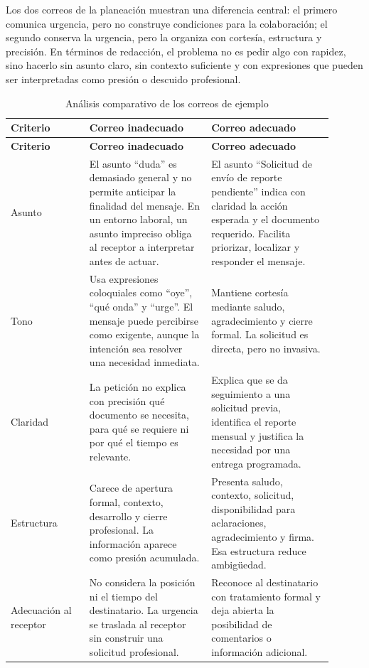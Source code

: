 Los dos correos de la planeación muestran una diferencia central: el primero comunica urgencia, pero no construye condiciones para la colaboración; el segundo conserva la urgencia, pero la organiza con cortesía, estructura y precisión. En términos de redacción, el problema no es pedir algo con rapidez, sino hacerlo sin asunto claro, sin contexto suficiente y con expresiones que pueden ser interpretadas como presión o descuido profesional.

\begin{longtable}{@{}p{0.22\linewidth}p{0.34\linewidth}p{0.34\linewidth}@{}}
\caption{Análisis comparativo de los correos de ejemplo}\label{tab:analisis-correos}\\
\toprule
\textbf{Criterio} & \textbf{Correo inadecuado} & \textbf{Correo adecuado} \\
\midrule
\endfirsthead
\toprule
\textbf{Criterio} & \textbf{Correo inadecuado} & \textbf{Correo adecuado} \\
\midrule
\endhead
Asunto & El asunto ``duda'' es demasiado general y no permite anticipar la finalidad del mensaje. En un entorno laboral, un asunto impreciso obliga al receptor a interpretar antes de actuar. & El asunto ``Solicitud de envío de reporte pendiente'' indica con claridad la acción esperada y el documento requerido. Facilita priorizar, localizar y responder el mensaje. \\
\addlinespace
Tono & Usa expresiones coloquiales como ``oye'', ``qué onda'' y ``urge''. El mensaje puede percibirse como exigente, aunque la intención sea resolver una necesidad inmediata. & Mantiene cortesía mediante saludo, agradecimiento y cierre formal. La solicitud es directa, pero no invasiva. \\
\addlinespace
Claridad & La petición no explica con precisión qué documento se necesita, para qué se requiere ni por qué el tiempo es relevante. & Explica que se da seguimiento a una solicitud previa, identifica el reporte mensual y justifica la necesidad por una entrega programada. \\
\addlinespace
Estructura & Carece de apertura formal, contexto, desarrollo y cierre profesional. La información aparece como presión acumulada. & Presenta saludo, contexto, solicitud, disponibilidad para aclaraciones, agradecimiento y firma. Esa estructura reduce ambigüedad. \\
\addlinespace
Adecuación al receptor & No considera la posición ni el tiempo del destinatario. La urgencia se traslada al receptor sin construir una solicitud profesional. & Reconoce al destinatario con tratamiento formal y deja abierta la posibilidad de comentarios o información adicional. \\
\bottomrule
\end{longtable}

